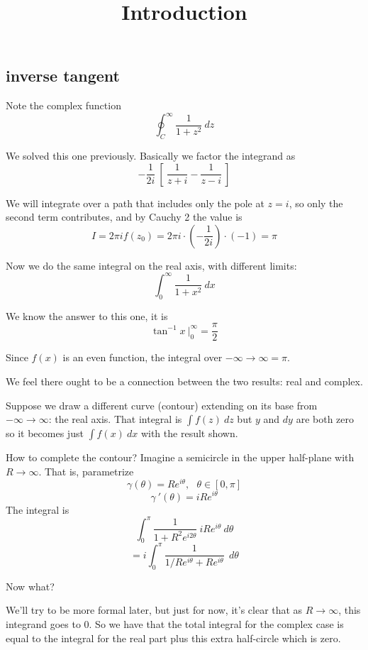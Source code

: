 \documentclass[11pt, oneside]{article}
\title{Introduction}
\date{}
\begin{document}
\maketitle
\Large




\subsection*{inverse tangent}

Note the complex function
\[ \oint_C^{\infty} \frac{1}{1 + z^2} \ dz \]

We solved this one previously.  Basically we factor the integrand as
\[ - \frac{1}{2i} \ [ \ \frac{1}{z + i} - \frac{1}{z - i} \ ] \]

We will integrate over a path that includes only the pole at $z = i$, so only the second term contributes, and by Cauchy 2 the value is
\[ I = 2 \pi i f(z_0) = 2 \pi i \cdot (- \frac{1}{2i}) \cdot (-1) = \pi \]

Now we do the same integral on the real axis, with different limits:
\[ \int_0^{\infty} \frac{1}{1 + x^2} \ dx \]

We know the answer to this one, it is 
\[ \tan^{-1} x \ \bigg |_0^{\infty} = \frac{\pi}{2}  \]

Since $f(x)$ is an even function, the integral over $-\infty \rightarrow \infty = \pi$.

We feel there ought to be a connection between the two results:  real and complex.

Suppose we draw a different curve (contour) extending on its base from $-\infty \rightarrow \infty$: the real axis.  That integral is $\int f(z) \ dz$ but $y$ and $dy$ are both zero so it becomes just $\int f(x) \ dx$ with the result shown.

How to complete the contour?  Imagine a semicircle in the upper half-plane with $R \rightarrow \infty$.  That is, parametrize
\[ \gamma(\theta) = Re^{i\theta}, \ \ \ \theta \in [0, \pi] \]
\[ \gamma \ '(\theta) =  iRe^{i\theta} \]
The integral is
\[ \int_0^{\pi} \frac{1}{1 + R^2 e^{i2\theta}} \ i R e^{i \theta} \ d \theta \]
\[ = i \int_0^{\pi} \frac{1}{1/Re^{i \theta}  + R e^{i\theta}} \ \ d \theta \]

Now what?

We'll try to be more formal later, but just for now, it's clear that as $R \rightarrow \infty$, this integrand goes to 0.  So we have that the total integral for the complex case is equal to the integral for the real part plus this extra half-circle which is zero.
\end{document}
